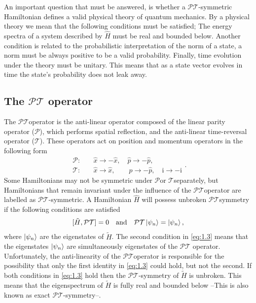 \documentclass[12pt, a4paper]{report}
\newcommand\PT{\(\mathcal{PT}\)}
\newcommand\PP{\(\mathcal{P}\)}
\newcommand\TT{\(\mathcal{T}\)}
\begin{document}
An important question that must be answered, is whether a \PT-symmetric Hamiltonian defines a valid physical theory of quantum mechanics. By a physical theory we mean that the following conditions must be satisfied; The energy spectra of a system described by $\hat{H}$ must be real and bounded below. Another condition is related to the probabilistic interpretation of the norm of a state, a norm must be always positive to be a valid probability. Finally, time evolution under the theory must be unitary. This means that as a state vector evolves in time the state's probability does not leak away\cite{MustaHbeHermitian}\cite{MakingSense}.

\subsection{The \texorpdfstring{$\mathcal{PT}$}\: operator}
The \PT\:operator is the anti-linear operator composed of the linear parity operator (\PP), which performs spatial reflection, and the anti-linear time-reversal operator (\TT). These operators act on position and momentum operators in the following form
\begin{equation}\label{eq:1.2}
\begin{split}
\mathcal{P}:& \quad\hat{x} \rightarrow -\hat{x},\quad \hat{p} \rightarrow -\hat{p},\\
\mathcal{T}:& \quad\hat{x} \rightarrow \hat{x},\quad\quad \hat{p} \rightarrow -\hat{p},\quad \mathrm{i} \rightarrow -\mathrm{i}
\end{split}.
\end{equation}
Some Hamiltonians may not be symmetric under \PP\:or \TT\:separately, but Hamiltonians that remain invariant under the influence of the \PT\:operator are labelled as \PT-symmetric. 
A Hamiltonian $\hat{H}$ will possess unbroken \PT\:symmetry if the following conditions are satisfied
\begin{equation}\label{eq:1.3}
[\tilde{H}, \mathcal{PT}] = 0\quad\mathrm{and}\quad\mathcal{PT}\ket{\psi_n} = \ket{\psi_n},
\end{equation}
where $\ket{\psi_n}$ are the eigenstates of $\tilde{H}$. The second condition in \ref{eq:1.3} means that the eigenstates $\ket{\psi_n}$ are simultaneously eigenstates of the \PT\: operator. Unfortunately, the anti-linearity of the \PT\:operator is responsible for the possibility that only the first identity in \ref{eq:1.3} could hold, but not the second\cite{Faria1}.
If both conditions in \ref{eq:1.3} hold then the \PT-symmetry of $\tilde{H}$ is unbroken. This means that the eigenspectrum of $\tilde{H}$ is fully real and bounded below --This is also known as exact \PT-symmetry--.
\end{document}

